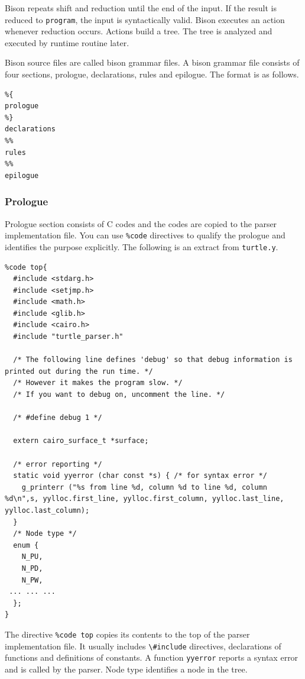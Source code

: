Bison repeats shift and reduction until the end of the input. If the
result is reduced to \passthrough{\lstinline!program!}, the input is
syntactically valid. Bison executes an action whenever reduction occurs.
Actions build a tree. The tree is analyzed and executed by runtime
routine later.

Bison source files are called bison grammar files. A bison grammar file
consists of four sections, prologue, declarations, rules and epilogue.
The format is as follows.

\begin{lstlisting}
%{
prologue
%}
declarations
%%
rules
%%
epilogue
\end{lstlisting}

\subsubsection{Prologue}\label{prologue}

Prologue section consists of C codes and the codes are copied to the
parser implementation file. You can use \passthrough{\lstinline!\%code!}
directives to qualify the prologue and identifies the purpose
explicitly. The following is an extract from
\passthrough{\lstinline!turtle.y!}.

\begin{lstlisting}
%code top{
  #include <stdarg.h>
  #include <setjmp.h>
  #include <math.h>
  #include <glib.h>
  #include <cairo.h>
  #include "turtle_parser.h"

  /* The following line defines 'debug' so that debug information is printed out during the run time. */
  /* However it makes the program slow. */
  /* If you want to debug on, uncomment the line. */

  /* #define debug 1 */

  extern cairo_surface_t *surface;

  /* error reporting */
  static void yyerror (char const *s) { /* for syntax error */
    g_printerr ("%s from line %d, column %d to line %d, column %d\n",s, yylloc.first_line, yylloc.first_column, yylloc.last_line, yylloc.last_column);
  }
  /* Node type */
  enum {
    N_PU,
    N_PD,
    N_PW,
 ... ... ...
  };
}
\end{lstlisting}

The directive \passthrough{\lstinline!\%code top!} copies its contents
to the top of the parser implementation file. It usually includes
\passthrough{\lstinline!\#include!} directives, declarations of
functions and definitions of constants. A function
\passthrough{\lstinline!yyerror!} reports a syntax error and is called
by the parser. Node type identifies a node in the tree.

